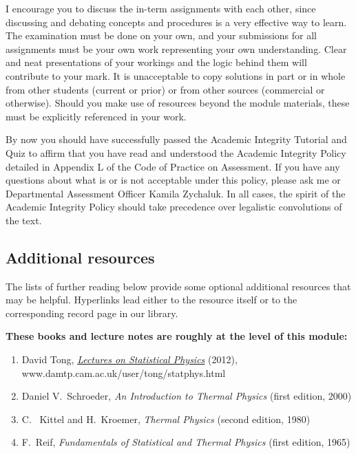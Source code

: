 I encourage you to discuss the in-term assignments with each other, since discussing and debating concepts and procedures is a very effective way to learn.
The examination must be done on your own, and your submissions for all assignments must be your own work representing your own understanding.
Clear and neat presentations of your workings and the logic behind them will contribute to your mark.
It is unacceptable to copy solutions in part or in whole from other students (current or prior) or from other sources (commercial or otherwise).
Should you make use of resources beyond the module materials, these must be explicitly referenced in your work.

By now you should have successfully passed the Academic Integrity Tutorial and Quiz to affirm that you have read and understood the Academic Integrity Policy detailed in Appendix L of the Code of Practice on Assessment.
If you have any questions about what is or is not acceptable under this policy, please ask me or Departmental Assessment Officer Kamila Zychaluk.
In all cases, the spirit of the Academic Integrity Policy should take precedence over legalistic convolutions of the text.



\subsection*{Additional resources}
The lists of further reading below provide some optional additional resources that may be helpful.
Hyperlinks lead either to the resource itself or to the corresponding record page in our library.

\noindent\textbf{These books and lecture notes are roughly at the level of this module:} \\[-24 pt]
\begin{enumerate}
  \item David Tong, \href{https://www.damtp.cam.ac.uk/user/tong/statphys.html}{\textit{Lectures on Statistical Physics}} (2012), \\ www.damtp.cam.ac.uk/user/tong/statphys.html
  \item Daniel V.~Schroeder, \textit{An Introduction to Thermal Physics} (first edition, 2000)
  \item C.~ Kittel and H.~Kroemer, \textit{Thermal Physics} (second edition, 1980)
  \item F.~Reif, \textit{Fundamentals of Statistical and Thermal Physics} (first edition, 1965)
\end{enumerate}


